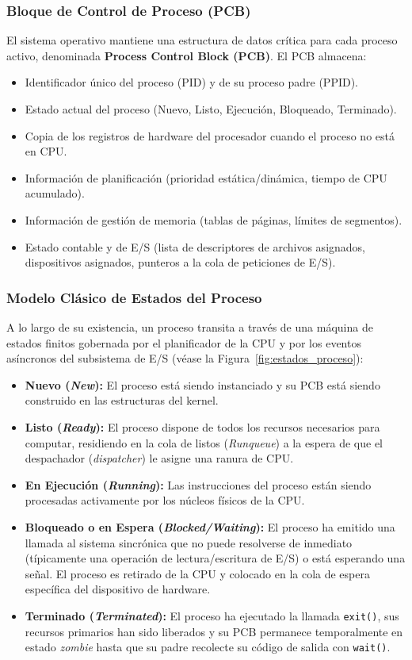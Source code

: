 \documentclass[11pt,letterpaper]{article}
\begin{document}
\subsubsection{Bloque de Control de Proceso (PCB)}
El sistema operativo mantiene una estructura de datos crítica para cada proceso activo, denominada \textbf{Process Control Block (PCB)}. El PCB almacena:
\begin{itemize}
    \item Identificador único del proceso (PID) y de su proceso padre (PPID).
    \item Estado actual del proceso (Nuevo, Listo, Ejecución, Bloqueado, Terminado).
    \item Copia de los registros de hardware del procesador cuando el proceso no está en CPU.
    \item Información de planificación (prioridad estática/dinámica, tiempo de CPU acumulado).
    \item Información de gestión de memoria (tablas de páginas, límites de segmentos).
    \item Estado contable y de E/S (lista de descriptores de archivos asignados, dispositivos asignados, punteros a la cola de peticiones de E/S).
\end{itemize}

\subsubsection{Modelo Clásico de Estados del Proceso}
A lo largo de su existencia, un proceso transita a través de una máquina de estados finitos gobernada por el planificador de la CPU y por los eventos asíncronos del subsistema de E/S (véase la Figura~\ref{fig:estados_proceso}):
\begin{itemize}
    \item \textbf{Nuevo (\textit{New}):} El proceso está siendo instanciado y su PCB está siendo construido en las estructuras del kernel.
    \item \textbf{Listo (\textit{Ready}):} El proceso dispone de todos los recursos necesarios para computar, residiendo en la cola de listos (\textit{Runqueue}) a la espera de que el despachador (\textit{dispatcher}) le asigne una ranura de CPU.
    \item \textbf{En Ejecución (\textit{Running}):} Las instrucciones del proceso están siendo procesadas activamente por los núcleos físicos de la CPU.
    \item \textbf{Bloqueado o en Espera (\textit{Blocked/Waiting}):} El proceso ha emitido una llamada al sistema sincrónica que no puede resolverse de inmediato (típicamente una operación de lectura/escritura de E/S) o está esperando una señal. El proceso es retirado de la CPU y colocado en la cola de espera específica del dispositivo de hardware.
    \item \textbf{Terminado (\textit{Terminated}):} El proceso ha ejecutado la llamada \texttt{exit()}, sus recursos primarios han sido liberados y su PCB permanece temporalmente en estado \textit{zombie} hasta que su padre recolecte su código de salida con \texttt{wait()}.
\end{itemize}
\end{document}

